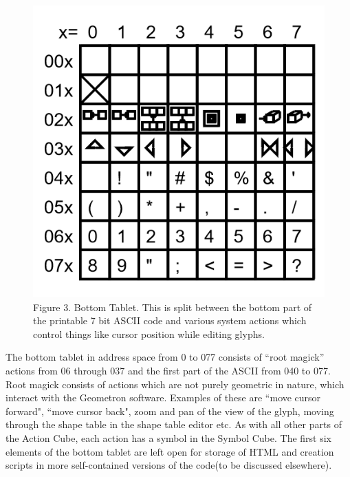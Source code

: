 \documentclass[11pt]{article}
\begin{document}
\begin{figure}
\includegraphics[width=\linewidth]{figures/figure3_bottomTablet.png}

\caption{Figure 3. Bottom Tablet.  This is split between the bottom part of the printable 7 bit ASCII code and various system actions which control things like cursor position while editing glyphs. }
\end{figure}

    The bottom tablet in address space from 0 to 077 consists of ``root magick'' actions from 06 through 037 and the first part of the ASCII from 040 to 077.  Root magick consists of actions which are not purely geometric in nature, which interact with the Geometron software.  Examples of these are ``move cursor forward", ``move cursor back", zoom and pan of the view of the glyph, moving through the shape table in the shape table editor etc.  As with all other parts of the Action Cube, each action has a symbol in the Symbol Cube.  The first six elements of the bottom tablet are left open for storage of HTML and creation scripts in more self-contained versions of the code(to be discussed elsewhere).  
\end{document}
